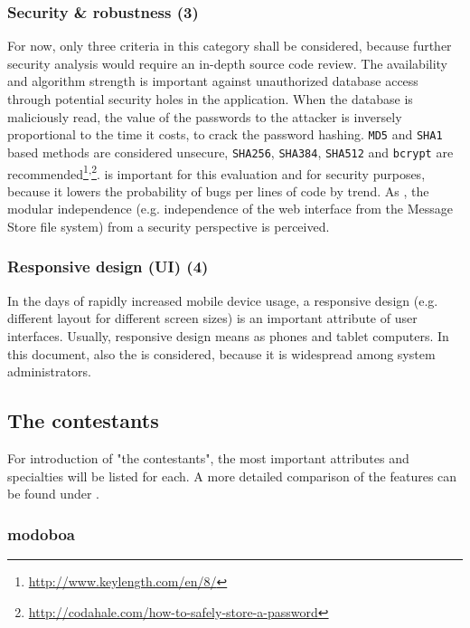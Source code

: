 \documentclass[12pt,a4paper]{scrartcl}
\begin{document}
			\subsubsection{Security \& robustness (3)}
				For now, only three criteria in this category shall be
				considered, because further security analysis would require an
				in-depth source code review. The 
				availability and algorithm strength is important against
				unauthorized database access through potential security holes
				in the application. When the database is maliciously read, the
				value of the passwords to the attacker is inversely
				proportional to the time it costs, to crack the password
				hashing. \texttt{MD5} and \texttt{SHA1} based methods are
				considered unsecure, \texttt{SHA256}, \texttt{SHA384},
				\texttt{SHA512} and \texttt{bcrypt} are
				recommended\footnote{\url{http://www.keylength.com/en/8/}}\textsuperscript{,}\footnote{\url{http://codahale.com/how-to-safely-store-a-password}}.
				 is important for this evaluation and
				for security purposes, because it lowers the probability of
				bugs per lines of code by trend. As ,
				the modular independence (e.g. independence of the web
				interface from the Message Store file system) from a security
				perspective is perceived.

			\subsubsection{Responsive design (\acs{UI}) (4)}
				In the days of rapidly increased mobile device usage, a
				responsive design (e.g. different layout for different screen
				sizes) is an important attribute of user interfaces. Usually,
				responsive design means 
				as phones and tablet computers. In this document, also the
				 is considered,
				because it is widespread among system administrators.

		\subsection{The contestants}
			For introduction of "the contestants", the most important
			attributes and specialties will be listed for each. A more detailed
			comparison of the features can be found under
			.

			\subsubsection{modoboa}
\end{document}
